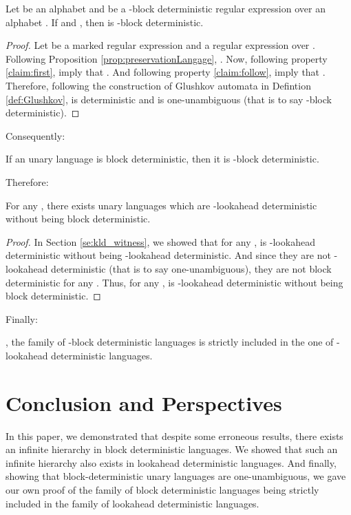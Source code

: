 \documentclass{llncs}
\begin{document}
\begin{lemma}
	Let  be an alphabet and  be a -block deterministic regular expression over an alphabet .
	If  and   , then  is -block deterministic.
\end{lemma}
\begin{proof}
	Let  be a marked regular expression and  a regular expression over .
	Following Proposition \ref{prop:preservationLangage}, .
	Now, following property \eqref{claim:first},  imply that .
	And following property \eqref{claim:follow},  imply that .
	Therefore, following the construction of Glushkov automata in Defintion \ref{def:Glushkov},  is deterministic and  is one-unambiguous (that is to say -block deterministic).
\end{proof}

	Consequently:

\begin{theorem}
	If an unary language is block deterministic, then it is -block deterministic.
\end{theorem}

	Therefore:

\begin{proposition}
	For any , there exists unary languages which are -lookahead deterministic without being block deterministic.	
\end{proposition}
\begin{proof}
	In Section \ref{se:kld_witness}, we showed that for any ,  is -lookahead deterministic without being -lookahead deterministic.
	And since they are not -lookahead deterministic (that is to say one-unambiguous), they are not block deterministic for any .
	Thus, for any ,  is -lookahead deterministic without being block deterministic.
\end{proof}

	Finally:

\begin{theorem}
	, the family of -block deterministic languages is strictly included in the one of -lookahead deterministic languages.
\end{theorem}


\section{Conclusion and Perspectives}

In this paper, we demonstrated that despite some erroneous results, there exists an infinite hierarchy in block deterministic languages.
We showed that such an infinite hierarchy also exists in lookahead deterministic languages.
And finally, showing that block-deterministic unary languages are one-unambiguous, we gave our own proof of the family of block deterministic languages being strictly included in the family of lookahead deterministic languages.
\end{document}
